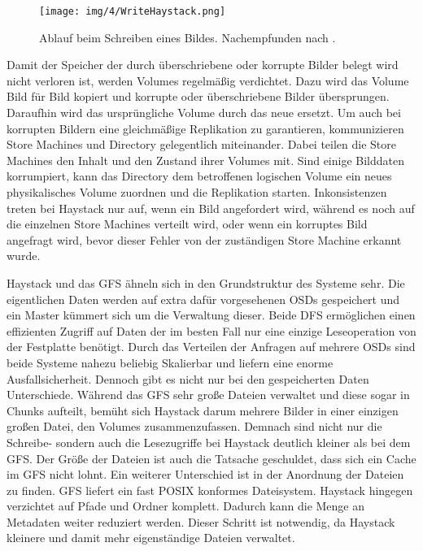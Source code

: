 \documentclass[12pt,oneside,a4paper,parskip]{scrbook}
\begin{document}
\begin{figure}[h]
  \centering
  \texttt{[image: img/4/WriteHaystack.png]}
  \caption[Ablauf beim Schreiben eines Bildes in Haystack.]{ Ablauf beim Schreiben eines Bildes. Nachempfunden nach \cite{haystack}.}
  \label{writeHaystack}
\end{figure}

Damit der Speicher der durch überschriebene oder korrupte Bilder belegt wird nicht verloren ist, werden Volumes regelmäßig verdichtet. Dazu wird das Volume Bild für Bild kopiert und korrupte oder überschriebene Bilder übersprungen. Daraufhin wird das ursprüngliche Volume durch das neue ersetzt. Um auch bei korrupten Bildern eine gleichmäßige Replikation zu garantieren, kommunizieren Store Machines und Directory gelegentlich miteinander. Dabei teilen die Store Machines den Inhalt und den Zustand ihrer Volumes mit. Sind einige Bilddaten korrumpiert, kann das Directory dem betroffenen logischen Volume ein neues physikalisches Volume zuordnen und die Replikation starten. Inkonsistenzen treten bei Haystack nur auf, wenn ein Bild angefordert wird, während es noch auf die einzelnen Store Machines verteilt wird, oder wenn ein korruptes Bild angefragt wird, bevor dieser Fehler von der zuständigen Store Machine erkannt wurde.

Haystack und das GFS ähneln sich in den Grundstruktur des Systeme sehr. Die eigentlichen Daten werden auf extra dafür vorgesehenen OSDs gespeichert und ein Master kümmert sich um die Verwaltung dieser. Beide DFS ermöglichen einen effizienten Zugriff auf Daten der im besten Fall nur eine einzige Leseoperation von der Festplatte benötigt. Durch das Verteilen der Anfragen auf mehrere OSDs sind beide Systeme nahezu beliebig Skalierbar und liefern eine enorme Ausfallsicherheit. Dennoch gibt es nicht nur bei den gespeicherten Daten Unterschiede. Während das GFS sehr große Dateien verwaltet und diese sogar in Chunks aufteilt, bemüht sich Haystack darum mehrere Bilder in einer einzigen großen Datei, den Volumes zusammenzufassen. Demnach sind nicht nur die Schreibe- sondern auch die Lesezugriffe bei Haystack deutlich kleiner als bei dem GFS. Der Größe der Dateien ist auch die Tatsache geschuldet, dass sich ein Cache im GFS nicht lohnt. Ein weiterer Unterschied ist in der Anordnung der Dateien zu finden. GFS liefert ein fast POSIX konformes Dateisystem. Haystack hingegen verzichtet auf Pfade und Ordner komplett. Dadurch kann die Menge an Metadaten weiter reduziert werden. Dieser Schritt ist notwendig, da Haystack kleinere und damit mehr eigenständige Dateien verwaltet. 
\end{document}
